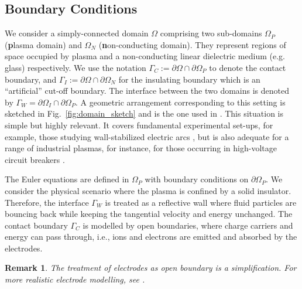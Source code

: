\documentclass{article}
\newtheorem*{remark}{Remark}
\begin{document}
\subsection{Boundary Conditions} \label{sec:BC}

We consider a simply-connected domain $\Omega$ comprising two sub-domains $\Omega_P$
(\textbf{p}lasma domain) and $\Omega_N$ (\textbf{n}on-conducting domain). They represent
regions of space occupied by plasma and a non-conducting linear dielectric medium
(e.g. glass) respectively. We use the notation
$\Gamma_C := \partial\Omega \cap \partial\Omega_P$ to denote the contact boundary, and
$\Gamma_I := \partial\Omega \cap \partial\Omega_N$ for the insulating boundary which is an
``artificial'' cut-off boundary. The interface between the two domains is denoted by
$\Gamma_W = \partial\Omega_I \cap \partial\Omega_P$. A geometric arrangement corresponding
to this setting is sketched in Fig.~\ref{fig:domain_sketch} and is the one used in
\cite[][Ch. 1, Sec. 4]{fuchs_2021}. This situation is simple but highly relevant. It
covers fundamental experimental set-ups, for example, those studying wall-stabilized
electric arcs \cite{GGF05}, but is also adequate for a range of industrial plasmas, for
instance, for those occurring in high-voltage circuit breakers \cite{SEE15,MGU20}.

The Euler equations are defined in $\Omega_P$ with boundary conditions on
$\partial\Omega_P$. We consider the physical scenario where the plasma is confined by a
solid insulator. Therefore, the interface $\Gamma_W$ is treated as a reflective wall where
fluid particles are bouncing back while keeping the tangential velocity and energy
unchanged. The contact boundary $\Gamma_C$ is modelled by open boundaries, where charge
carriers and energy can pass through, i.e., ions and electrons are emitted and absorbed by
the electrodes.

\begin{remark}
  The treatment of electrodes as open boundary is a simplification. For more realistic
  electrode modelling, see \cite{godyak_1990, parker_1993}.
\end{remark}
\end{document}
